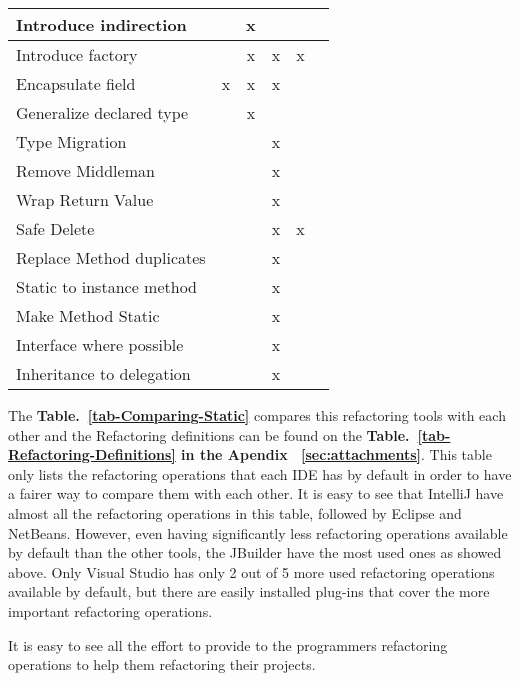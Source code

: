 \begin{table}[htbp]
\begin{tabular}{|l|c|c|c|c|c|}
Introduce indirection     &               & x       &          &          &          \\ \hline
Introduce factory         &               & x       & x        & x        &          \\ \hline
Encapsulate field         & x             & x       & x        &          &          \\ \hline
Generalize declared type  &               & x       &          &          &          \\ \hline
Type Migration            &               &         & x        &          &          \\ \hline
Remove Middleman          &               &         & x        &          &          \\ \hline
Wrap Return Value         &               &         & x        &          &          \\ \hline
Safe Delete               &               &         & x        & x        &          \\ \hline
Replace Method duplicates &               &         & x        &          &          \\ \hline
Static to instance method &               &         & x        &          &          \\ \hline
Make Method Static        &               &         & x        &          &          \\ \hline
Interface where possible  &               &         & x        &          &          \\ \hline
Inheritance to delegation &               &         & x        &          &          \\ \hline
\end{tabular}
\end{table}


The {\bf Table.~\ref{tab-Comparing-Static}} compares this refactoring tools with each other and the Refactoring definitions can be found on the {\bf Table.~\ref{tab-Refactoring-Definitions} in the Apendix ~\ref{sec:attachments}}. 
This table only lists the refactoring operations that each IDE has by default in order to have a fairer way to compare them with each other.
It is easy to see that IntelliJ have almost all the refactoring operations in this table, followed by Eclipse and NetBeans.
However, even having significantly less refactoring operations available by default than the other tools, the JBuilder have the most used ones as showed above.
Only Visual Studio has only 2 out of 5 more used refactoring operations available by default, but there are easily installed plug-ins that cover the more important refactoring operations. 

It is easy to see all the effort to provide to the programmers refactoring operations to help them refactoring their projects.

